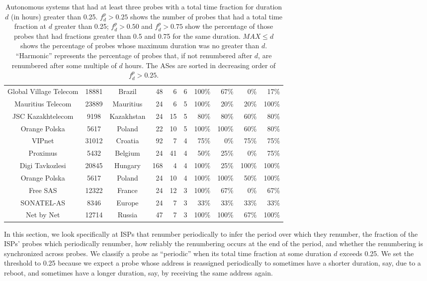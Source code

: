 \begin{table*}[t]
\begin{center}
\begin{tiny}
\begin{tabular}{ccc|r|rr|r<{\%}r<{\%}|r<{\%}r<{\%}}
Global Village Telecom & 18881&Brazil    &  48&      6&    6&    100&     67&      0&     17\\
Mauritius Telecom& 23889&Mauritius &  24&      6&    5&    100&     20&     20&    100\\
JSC Kazakhtelecom&  9198&Kazakhstan&  24&     15&    5&     80&     80&     60&     80\\
Orange Polska  &  5617&Poland    &  22&     10&    5&    100&    100&     60&     80\\
VIPnet         & 31012&Croatia   &  92&      7&    4&     75&      0&     75&     75\\
Proximus       &  5432&Belgium   &  24&     41&    4&     50&     25&      0&     75\\
Digi Tavkozlesi& 20845&Hungary   & 168&      4&    4&    100&     25&    100&    100\\
Orange Polska  &  5617&Poland    &  24&     10&    4&    100&    100&     50&    100\\
Free SAS       & 12322&France    &  24&     12&    3&    100&     67&      0&     67\\
SONATEL-AS     &  8346&Europe    &  24&      7&    3&     33&     33&     33&     33\\
Net by Net     & 12714&Russia    &  47&      7&    3&    100&    100&     67&    100\\
   \end{tabular}
  \end{tiny}
  \end{center}
  \caption[ASes that renumber periodically]{\label{tbl:periodic_asns} Autonomous
    systems that had at least three probes with a total time fraction
    for duration $d$ (in hours) greater than 0.25. $f^p_d > 0.25$ shows
    the number of probes that had a total time fraction at $d$ greater than 0.25;
    $f^p_d > 0.50$ and $f^p_d > 0.75$ show the percentage of those probes
    that had fractions greater than 0.5 and 0.75 for the same duration.
    $MAX \leq d$ shows the percentage of probes whose maximum duration was no greater than
    $d$. ``Harmonic'' represents the percentage of probes that, if not renumbered after $d$, are renumbered after some multiple of $d$ hours.
    The ASes are sorted in decreasing order of $f^p_d > 0.25$.}
\end{table*}

In this section, we look specifically at ISPs that renumber
periodically to infer the period over which they renumber,
the fraction of the ISPs' probes which periodically renumber, how
reliably the renumbering occurs at the end of the period, and whether the
renumbering is synchronized across probes.  We classify a
probe as ``periodic'' when its total time fraction at
some duration $d$ exceeds 0.25.  We set the threshold to 0.25
because we expect a probe whose address is reassigned
periodically to sometimes have a shorter duration, say, due
to a reboot, and sometimes have a longer duration, say, by
receiving the same address again. 

